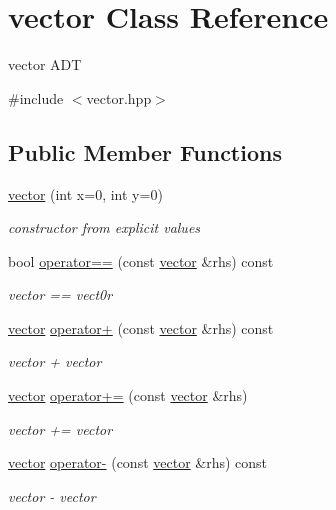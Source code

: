 \hypertarget{classvector}{}\section{vector Class Reference}
\label{classvector}


vector A\+DT  




{\ttfamily \#include $<$vector.\+hpp$>$}

\subsection*{Public Member Functions}
\begin{DoxyCompactItemize}
\item 
\hyperlink{classvector_ada69c108ec9393e6f70bdfcd58366cbf}{vector} (int x=0, int y=0)
\begin{DoxyCompactList}\small\item\em constructor from explicit values \end{DoxyCompactList}\item 
bool \hyperlink{classvector_a3fafaffe7fdcc82cb9bd2cf53d933c1c}{operator==} (const \hyperlink{classvector}{vector} \&rhs) const 
\begin{DoxyCompactList}\small\item\em vector == vect0r \end{DoxyCompactList}\item 
\hyperlink{classvector}{vector} \hyperlink{classvector_a2ab7f62262c6f0c6ade3bd1879e6001e}{operator+} (const \hyperlink{classvector}{vector} \&rhs) const 
\begin{DoxyCompactList}\small\item\em vector + vector \end{DoxyCompactList}\item 
\hyperlink{classvector}{vector} \hyperlink{classvector_ad62f9ffeab2c2b5963ca90092b89d525}{operator+=} (const \hyperlink{classvector}{vector} \&rhs)
\begin{DoxyCompactList}\small\item\em vector += vector \end{DoxyCompactList}\item 
\hyperlink{classvector}{vector} \hyperlink{classvector_ad9596a53b6aef33bbddfa7b9b4b17f09}{operator-\/} (const \hyperlink{classvector}{vector} \&rhs) const 
\begin{DoxyCompactList}\small\item\em vector -\/ vector \end{DoxyCompactList}\item 

\end{DoxyCompactItemize}
